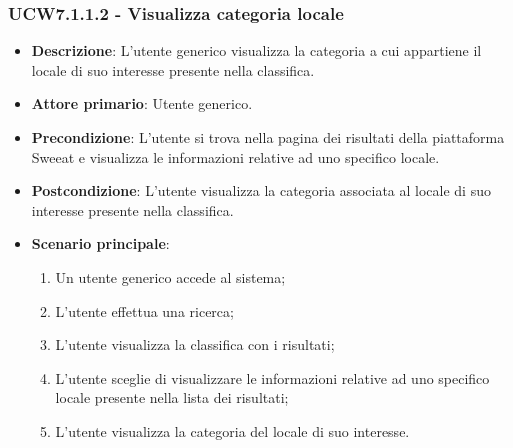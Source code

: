 \subsubsection{UCW7.1.1.2 - Visualizza categoria locale}
\begin{itemize}
	\item \textbf{Descrizione}: L'utente generico visualizza la categoria a cui appartiene il locale di suo interesse presente nella classifica.
    \item \textbf{Attore primario}: Utente generico.
    \item \textbf{Precondizione}: L’utente si trova nella pagina dei risultati della piattaforma Sweeat e visualizza le informazioni relative ad uno specifico locale.
    \item \textbf{Postcondizione}: L’utente visualizza la categoria associata al locale di suo interesse presente nella classifica.
    \item \textbf{Scenario principale}: 
    \begin{enumerate}
        \item Un utente generico accede al sistema;
        \item L’utente effettua una ricerca;
        \item L'utente visualizza la classifica con i risultati;
        \item L'utente sceglie di visualizzare le informazioni relative ad uno specifico locale presente nella lista dei risultati;
        \item L'utente visualizza la categoria del locale di suo interesse.
    \end{enumerate}
\end{itemize}


